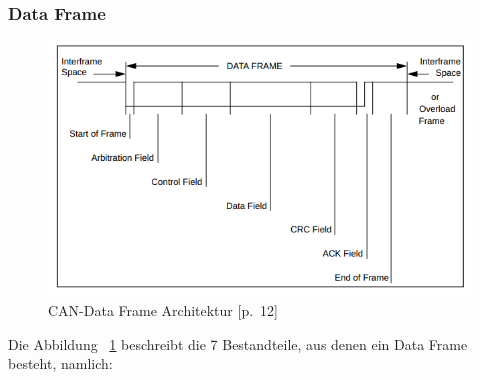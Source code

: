 \subsubsection{Data Frame}
\begin{figure}[h]
	 \begin{center}
	  \includegraphics[width=1\textwidth]{./images/CAN-data-frame.jpg}
	\end{center}
	\vspace{-5pt}
	\caption[CAN-Data Frame Architektur]{CAN-Data Frame Architektur \cite{Bosch1991}[p.~12]} %
	\label{fig:can-data-frame}
	\vspace{-5pt}
	\end{figure}
Die Abbildung ~\ref{fig:can-data-frame} beschreibt die 7 Bestandteile, aus denen ein Data Frame besteht, namlich:

